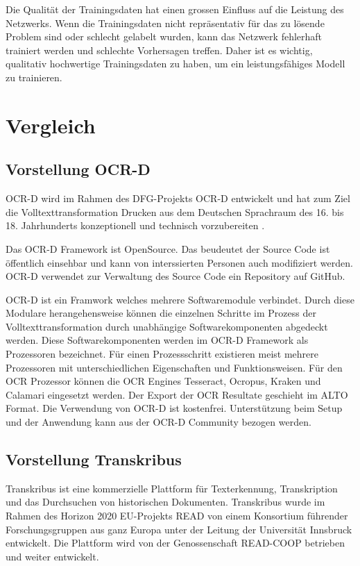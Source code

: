 \documentclass[a4paper,oneside, 12pt]{report}
\begin{document}
Die Qualität der Trainingsdaten hat einen grossen Einfluss auf die Leistung des Netzwerks. Wenn die Trainingsdaten nicht repräsentativ für das zu lösende Problem sind oder schlecht gelabelt wurden, kann das Netzwerk fehlerhaft trainiert werden und schlechte Vorhersagen treffen. Daher ist es wichtig, qualitativ hochwertige Trainingsdaten zu haben, um ein leistungsfähiges Modell zu trainieren.

\chapter{Vergleich}\label{sec:vergleich}

\section{Vorstellung OCR-D}
OCR-D wird im Rahmen des DFG-Projekts OCR-D entwickelt und hat zum Ziel die Volltexttransformation Drucken aus dem Deutschen Sprachraum des 16. bis 18. Jahrhunderts konzeptionell und technisch vorzubereiten \cite{standOCR-D}. 

Das OCR-D Framework ist OpenSource. Das beudeutet der Source Code ist öffentlich einsehbar und kann von interssierten Personen auch modifiziert werden. OCR-D verwendet zur Verwaltung des Source Code ein Repository auf GitHub.\cite{ocrdgithub}

OCR-D ist ein Framwork welches mehrere Softwaremodule verbindet. Durch diese Modulare herangehensweise können die einzelnen Schritte im Prozess der Volltexttransformation durch unabhängige Softwarekomponenten abgedeckt werden. Diese Softwarekomponenten werden im OCR-D Framework als Prozessoren bezeichnet. Für einen Prozessschritt existieren meist mehrere Prozessoren mit unterschiedlichen Eigenschaften und Funktionsweisen. Für den \ac{OCR} Prozessor können die OCR Engines Tesseract, Ocropus, Kraken und Calamari eingesetzt werden. Der Export der OCR Resultate geschieht im ALTO Format. Die Verwendung von OCR-D ist kostenfrei. Unterstützung beim Setup und der Anwendung kann aus der OCR-D Community bezogen werden. \cite{ocrdfaq}

\section{Vorstellung Transkribus}
Transkribus ist eine kommerzielle Plattform für Texterkennung, Transkription und das Durchsuchen von historischen Dokumenten. Transkribus wurde im Rahmen des Horizon 2020 EU-Projekts READ von einem Konsortium führender Forschungsgruppen aus ganz Europa unter der Leitung der Universität Innsbruck entwickelt. Die Plattform wird von der Genossenschaft READ-COOP betrieben und weiter entwickelt. \cite{readcoopabout} 
\end{document}
